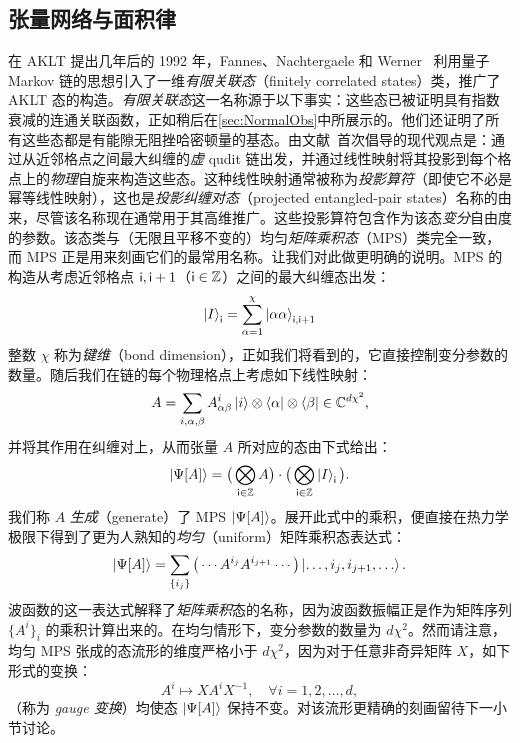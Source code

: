 \subsection{张量网络与面积律}\label{sec:AreaLaw}
在 AKLT 提出几年后的 1992 年，Fannes、Nachtergaele 和 Werner~\cite{Fannes1990} 利用量子 Markov 链的思想引入了一维\emph{有限关联态}（finitely correlated states）类，推广了 AKLT 态的构造。\emph{有限关联态}这一名称源于以下事实：这些态已被证明具有指数衰减的连通关联函数，正如稍后在\cref{sec:NormalObs}中所展示的。他们还证明了所有这些态都是有能隙无阻挫哈密顿量的基态。由文献~\cite{Delgado2004}首次倡导的现代观点是：通过从近邻格点之间最大纠缠的\emph{虚} qudit 链出发，并通过线性映射将其投影到每个格点上的\emph{物理}自旋来构造这些态。这种线性映射通常被称为\emph{投影算符}（即使它不必是幂等线性映射），这也是\emph{投影纠缠对态}（projected entangled-pair states）名称的由来，尽管该名称现在通常用于其高维推广。这些投影算符包含作为该态\emph{变分}自由度的参数。该态类与（无限且平移不变的）均匀\emph{矩阵乘积态}（MPS）类完全一致，而 MPS 正是用来刻画它们的最常用名称。让我们对此做更明确的说明。MPS 的构造从考虑近邻格点 $\mathsf i,\mathsf i+1$（$\mathsf i\in\mathbb Z$）之间的最大纠缠态出发：
\begin{equation}
    \ket{I}_\mathsf i = \sum_{\alpha=1}^\chi \ket{\alpha\alpha}_{\mathsf i, \mathsf i+1}
\end{equation}
整数 $\chi$ 称为\emph{键维}（bond dimension），正如我们将看到的，它直接控制变分参数的数量。随后我们在链的每个物理格点上考虑如下线性映射：
\begin{equation}
    A = \sum_{i,\alpha,\beta} A_{\alpha\beta}^i \ket{i}\otimes\bra{\alpha}\otimes\bra{\beta} \in \mathbb C^{d\chi^2},
\end{equation}
并将其作用在纠缠对上，从而张量 $A$ 所对应的态由下式给出：
\begin{equation}
    \ket{\Psi[A]} = \big(\bigotimes_{\mathsf i\in\mathbb Z} A\big) \cdot \big(\bigotimes_{\mathsf i\in\mathbb Z} \ket{I}_{\mathsf i}\big).
\end{equation}
我们称 $A$ \emph{生成}（generate）了 MPS $\ket{\Psi[A]}$。展开此式中的乘积，便直接在热力学极限下得到了更为人熟知的\emph{均匀}（uniform）矩阵乘积态表达式：
\begin{equation}\label{eq:MPS}
    \ket{\Psi[A]} = \sum_{\{i_j\}} \big(\cdots A^{i_j}A^{i_{j+1}}\cdots \big) \ket{\dots, i_j,i_{j+1},\dots}.
\end{equation}
波函数的这一表达式解释了\emph{矩阵乘积}态的名称，因为波函数振幅正是作为矩阵序列 $\{A^i\}_i$ 的乘积计算出来的。在均匀情形下，变分参数的数量为 $d\chi^2$。然而请注意，均匀 MPS 张成的态流形的维度严格小于 $d\chi^2$，因为对于任意非奇异矩阵 $X$，如下形式的变换：
\begin{equation}
    A^i \mapsto XA^iX^{-1}, \quad \forall i=1,2,\dots,d,
\end{equation}
（称为 \emph{gauge 变换}）均使态 $\ket{\Psi[A]}$ 保持不变。对该流形更精确的刻画留待下一小节讨论。

